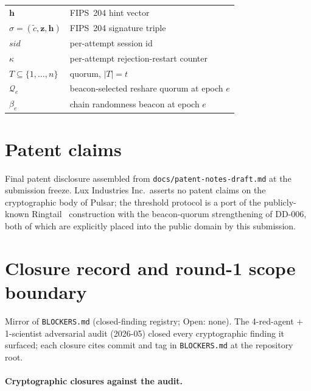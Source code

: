 \documentclass[11pt,a4paper]{article}
\theoremstyle{definition}
\theoremstyle{remark}
\begin{document}
\begin{center}
\begin{tabular}{l l}
$\mathbf{h}$ & FIPS~204 hint vector \\
$\sigma = (\tilde c, \mathbf{z}, \mathbf{h})$ & FIPS~204 signature triple \\
$\mathit{sid}$ & per-attempt session id \\
$\kappa$ & per-attempt rejection-restart counter \\
$T \subseteq \{1, \dots, n\}$ & quorum, $|T| = t$ \\
$\mathcal{Q}_e$ & beacon-selected reshare quorum at epoch $e$ \\
$\beta_e$ & chain randomness beacon at epoch $e$ \\
\bottomrule
\end{tabular}
\end{center}

\section{Patent claims}
\label{sec:patent}
Final patent disclosure assembled from
\texttt{docs/patent-notes-draft.md} at the submission freeze. Lux
Industries Inc.\ asserts no patent claims on the cryptographic body
of Pulsar; the threshold protocol is a port of the publicly-known
Ringtail~\cite{boschini2024ringtail} construction with the beacon-quorum
strengthening of DD-006, both of which are explicitly placed into
the public domain by this submission.

\section{Closure record and round-1 scope boundary}
\label{sec:knownlimits}
Mirror of \texttt{BLOCKERS.md} (closed-finding registry; Open: none).
The 4-red-agent + 1-scientist adversarial audit (2026-05) closed
every cryptographic finding it surfaced; each closure cites commit
and tag in \texttt{BLOCKERS.md} at the repository root.

\paragraph{Cryptographic closures against the audit.}
\end{document}
